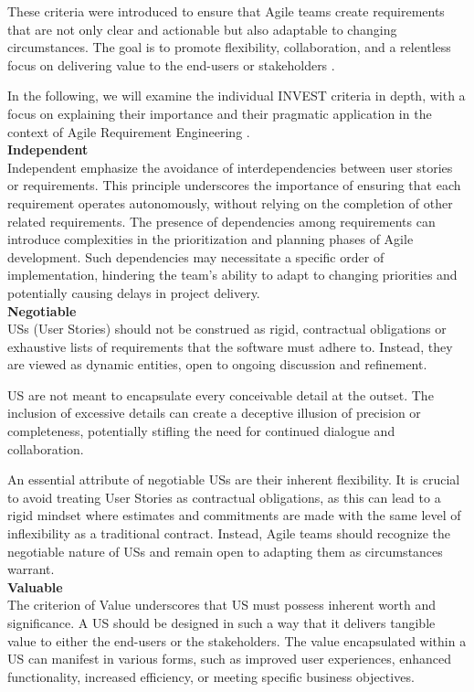 These criteria were introduced to ensure that Agile teams create requirements that are not only clear and actionable but also adaptable to changing circumstances. The goal is to promote flexibility, collaboration, and a relentless focus on delivering value to the end-users or stakeholders \cite{buglione2013improving}.

In the following, we will examine the individual INVEST criteria in depth, with a focus on explaining their importance and their pragmatic application in the context of Agile Requirement Engineering \cite{cohn2004user}. \\ 
\textbf{Independent} \\ 
Independent emphasize the avoidance of interdependencies between user stories or requirements. This principle underscores the importance of ensuring that each requirement operates autonomously, without relying on the completion of other related requirements. The presence of dependencies among requirements can introduce complexities in the prioritization and planning phases of Agile development. Such dependencies may necessitate a specific order of implementation, hindering the team's ability to adapt to changing priorities and potentially causing delays in project delivery. \\ 
\textbf{Negotiable}\\ 
 USs (User Stories) should not be construed as rigid, contractual obligations or exhaustive lists of requirements that the software must adhere to. Instead, they are viewed as dynamic entities, open to ongoing discussion and refinement.

US are not meant to encapsulate every conceivable detail at the outset. The inclusion of excessive details can create a deceptive illusion of precision or completeness, potentially stifling the need for continued dialogue and collaboration. 

An essential attribute of negotiable USs are their inherent flexibility. It is crucial to avoid treating User Stories as contractual obligations, as this can lead to a rigid mindset where estimates and commitments are made with the same level of inflexibility as a traditional contract. Instead, Agile teams should recognize the negotiable nature of USs and remain open to adapting them as circumstances warrant. \\ 
\textbf{Valuable}\\ 
The criterion of Value underscores that US must possess inherent worth and significance. A US should be designed in such a way that it delivers tangible value to either the end-users or the stakeholders. The value encapsulated within a US can manifest in various forms, such as improved user experiences, enhanced functionality, increased efficiency, or meeting specific business objectives.

